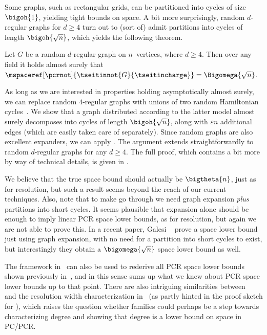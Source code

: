 Some graphs, such as rectangular grids, can be partitioned into cycles
of size~$\bigoh{1}$, yielding tight bounds on space.
A bit more surprisingly, random \mbox{$d$-regular} graphs for $d \geq 4$ turn out to
(sort of)
admit partitions into cycles of %
length
$\bigoh{\sqrt{n}}$,
which yields the following theorem.

\begin{theorem}
  \label{thm:improved-general}
  Let $G$ be a random $d$-regular graph on $n$~vertices, where $d\geq 4$.
  Then over any field it holds almost surely that
  $\mspaceref[\pcrnot]{\tseitinnot{G}{\tseitincharge}} = \Bigomega{\sqrt{n}}$.
\end{theorem}

\begin{ourproof}[sketch]
  As long as we are interested in properties holding asymptotically
  almost surely, we can replace random $4$-regular graphs with unions
  of two random Hamiltonian cycles~\cite{KW}.
  We show that a graph distributed according to the latter
  model almost surely decomposes into cycles of length
  $\bigoh{\sqrt{n}}$, along with $\varepsilon n$ additional edges 
  (which are easily taken care of separately).
  Since random graphs are also excellent expanders, we can
  apply 
 .
  The argument  
  extends straightforwardly
  to random $d$-regular graphs for any 
  $d  \geq 4$.
  The full proof, which contains a bit more by way of technical
  details, is  given in
 .
\end{ourproof}

%
We 
%
believe that the true space bound should actually be
$\bigtheta{n}$, just as for resolution, but such a result seems beyond
the reach of 
our current techniques.
%
Also, note that to make
go through we need graph expansion
\emph{plus}
partitions into %
short cycles.
%
It seems 
%
plausible that expansion alone should 
be enough to imply
linear PCR space lower bounds, as for resolution, but again
we are not able to prove this.
In a recent paper, Galesi \etal~\cite{GKT19SpaceWidth}
  prove a space lower bound just using graph expansion, with no need
  for a partition into %
  short cycles to exist, but interestingly they
  obtain a $\bigomega{\sqrt{n}}$ space lower bound as well.


%
\label{sec:space-compl-funct}


The framework in~\cite{BG15Framework} can also be used to
rederive all PCR space lower bounds shown previously 
in~\cite{ABRW02SpaceComplexity,FLNRT15SpaceCplx}, and in this sense
\cite{BG15Framework} 
sums up what we knew about PCR space lower bounds up to that point.
There are also intriguing similarities between~%
\cite{BG15Framework} 
and the resolution width characterization 
  in~\cite{AD08CombinatoricalCharacterization}
(as partly hinted in the proof sketch for
),
which raises the question whether
\kextendibleNok families 
could perhaps be a step towards
characterizing degree and showing that degree
%
%
is a lower bound on  %
%
%
space in PC/PCR.

